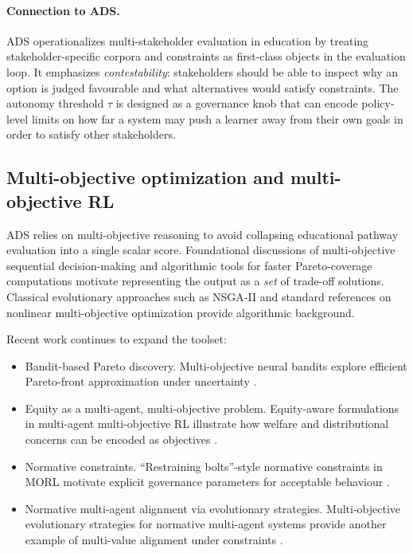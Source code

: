 \documentclass{article}
\begin{document}
\paragraph{Connection to ADS.}
ADS operationalizes multi-stakeholder evaluation in education by treating stakeholder-specific corpora and constraints as first-class objects in the evaluation loop.
It emphasizes \emph{contestability}: stakeholders should be able to inspect why an option is judged favourable and what alternatives would satisfy constraints.
The autonomy threshold $\tau$ is designed as a governance knob that can encode policy-level limits on how far a system may push a learner away from their own goals in order to satisfy other stakeholders.

\subsection{Multi-objective optimization and multi-objective RL}
\label{sec:rw-moo}

ADS relies on multi-objective reasoning to avoid collapsing educational pathway evaluation into a single scalar score.
Foundational discussions of multi-objective sequential decision-making \cite{roijers2013survey_mosdm} and algorithmic tools for faster Pareto-coverage computations \cite{roijers2015convex} motivate representing the output as a \emph{set} of trade-off solutions.
Classical evolutionary approaches such as NSGA-II \cite{deb2002nsga2} and standard references on nonlinear multi-objective optimization \cite{miettinen1999nonlinearMOO} provide algorithmic background.

Recent work continues to expand the toolset:
\begin{itemize}
    \item {Bandit-based Pareto discovery.} Multi-objective neural bandits explore efficient Pareto-front approximation under uncertainty \cite{monb2025}.
    \item {Equity as a multi-agent, multi-objective problem.} Equity-aware formulations in multi-agent multi-objective RL illustrate how welfare and distributional concerns can be encoded as objectives \cite{equityMAMORL2025}.
    \item {Normative constraints.} ``Restraining bolts''-style normative constraints in MORL motivate explicit governance parameters for acceptable behaviour \cite{restrainingBolts2025}.
    \item {Normative multi-agent alignment via evolutionary strategies.} Multi-objective evolutionary strategies for normative multi-agent systems provide another example of multi-value alignment under constraints \cite{riad2025nova}.
\end{itemize}
\end{document}
